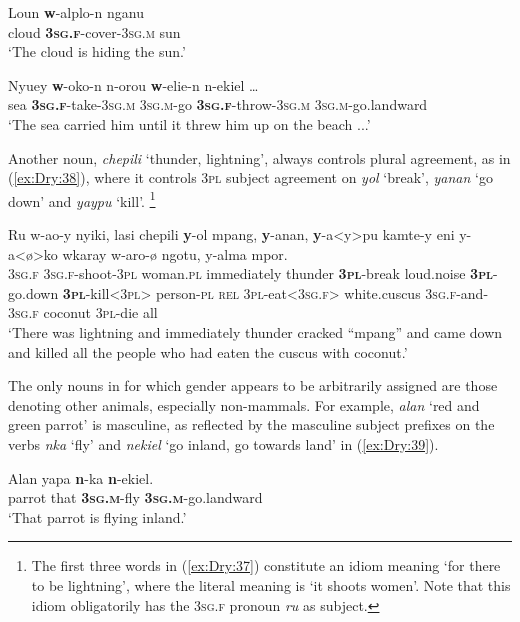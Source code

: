 \documentclass[output=collectionpaper]{langsci/langscibook}
\begin{document}
\ea \label{ex:Dry:36}
\gll Loun	\textbf{w}-alplo-n	nganu\\
cloud \textbf{\textsc{3sg.f}}-cover-\textsc{3sg.m} sun\\
\glt `The cloud is hiding the sun.'
\z

\ea \label{ex:Dry:37}
\gll Nyuey	\textbf{w}-oko-n	n-orou	\textbf{w}-elie-n {n-ekiel \ldots} \\
sea \textbf{\textsc{3sg.f}}-take-\textsc{3sg.m} \textsc{3sg.m}-go \textbf{\textsc{3sg.f}}-throw-\textsc{3sg.m} \textsc{3sg.m}-go.landward \\
\glt `The sea carried him until it threw him up on the beach ...'
\z

Another noun, \textit{chepili} `thunder, lightning', always controls plural agreement, as in (\ref{ex:Dry:38}), where it controls \textsc{3pl} subject agreement on \textit{yol} `break', \textit{yanan} `go down' and \textit{yaypu} `kill'.%
\footnote{The first three words in (\ref{ex:Dry:37}) constitute an idiom meaning `for there to be lightning', where the literal meaning is `it shoots women'. Note that this idiom obligatorily has the \textsc{3sg.f} pronoun \textit{ru} as subject.}

\ea \label{ex:Dry:38}
\gll Ru	w-ao-y	nyiki,	lasi	chepili \textbf{y}-ol	mpang,	\textbf{y}-anan,	\textbf{y}-a<y>pu kamte-y	eni	y-a<ø>ko	wkaray w-aro-ø	ngotu,	y-alma	mpor.\\
\textsc{3sg.f} \textsc{3sg.f}-shoot-\textsc{3pl} woman.\textsc{pl} immediately  thunder \textbf{\textsc{3pl}}-break loud.noise \textbf{\textsc{3pl}}-go.down \textbf{\textsc{3pl}}-kill<\textsc{3pl}>  person-\textsc{pl} \textsc{rel} \textsc{3pl}-eat<\textsc{3sg.f}> white.cuscus
\textsc{3sg.f}-and-\textsc{3sg.f} coconut \textsc{3pl}-die all\\
\glt `There was lightning and immediately thunder cracked ``mpang'' and came down and killed all the people who had eaten the cuscus with coconut.'
\z

The only nouns in  for which gender appears to be arbitrarily assigned are those denoting other animals, especially non-mammals. For example, \textit{alan} `red and green parrot' is masculine, as reflected by the masculine subject prefixes on the verbs \textit{nka} `fly' and \textit{nekiel} `go inland, go towards land' in (\ref{ex:Dry:39}).

\ea \label{ex:Dry:39}
\gll Alan	yapa	\textbf{n}-ka	\textbf{n}-ekiel.\\
parrot that \textbf{\textsc{3sg.m}}-fly \textbf{\textsc{3sg.m}}-go.landward\\
\glt  `That parrot is flying inland.'
\z
\end{document}
